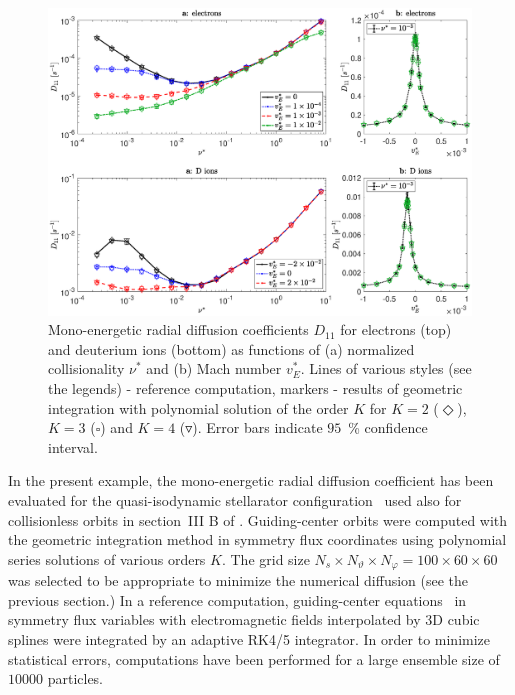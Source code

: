 \documentclass[./main.tex]{subfiles}
\begin{document}
%
\begin{figure}[t]
	\centerline{\includegraphics[keepaspectratio,width=1.1\linewidth]{figures/transport_coefficient_electrons_dions.eps}}
	\captionsetup{justification=raggedright,singlelinecheck=false,textfont=footnotesize,labelfont=footnotesize}
	\caption{Mono-energetic radial diffusion coefficients $D_{11}$ for electrons (top) and deuterium
	ions (bottom)
	as functions of (a) normalized collisionality $\nu^\ast$ and (b)  Mach number $v_E^\ast$.
	Lines of various styles (see the legends) - reference computation, markers - results of geometric
	integration with polynomial solution of the order $K$ for $K=2$ ($\Diamond$), $K=3$ ($\square$)
	and $K=4$ ($\triangledown$).
	Error bars indicate $95$~\% confidence interval.}
	\label{fig:transport_coefficient_electrons_dions}
\end{figure}
%
In the present example, the mono-energetic radial diffusion coefficient has been evaluated
for the quasi-isodynamic stellarator configuration~\cite{drevlak_quasi-isodynamic_2014}
used also for collisionless orbits in section~\textrm{III B} of \cite{paper_gorilla}.
Guiding-center orbits were computed with the geometric integration method in symmetry flux coordinates
using polynomial series solutions of various orders $K$.
The grid size $N_s \times N_\vartheta \times N_\varphi = 100 \times 60 \times 60$ was selected to be appropriate to
minimize the numerical diffusion (see the previous section.) In a reference computation, guiding-center
equations~ in symmetry flux variables with electromagnetic fields interpolated
by 3D cubic splines were integrated by an adaptive RK4/5 integrator.
In order to minimize statistical errors, computations have been performed for a large ensemble size
of $10000$ particles.
\end{document}
